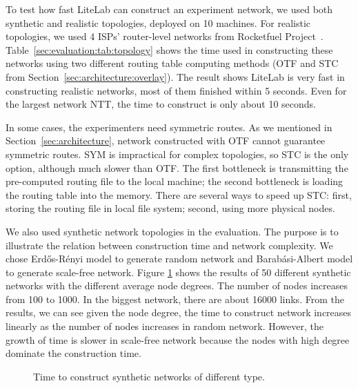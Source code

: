 \documentclass[conference]{IEEEtran}
\begin{document}
To test how fast LiteLab can construct an experiment network, we used
both synthetic and realistic topologies, deployed on 10 machines. For
realistic topologies, we used 4 ISPs' router-level networks from
Rocketfuel Project~\cite{SpringN:Rocketfuel}.
Table~\ref{sec:evaluation:tab:topology} shows the time used in
constructing these networks using two different routing table
computing methods (OTF and STC from
Section~\ref{sec:architecture:overlay}).  The result shows LiteLab is
very fast in constructing realistic networks, most of them finished
within 5 seconds. Even for the largest network NTT, the time to
construct is only about 10 seconds.

In some cases, the experimenters need symmetric routes. As we
mentioned in Section~\ref{sec:architecture}, network constructed with
OTF cannot guarantee symmetric routes. SYM is impractical for complex
topologies, so STC is the only option, although much slower than
OTF. The first bottleneck is transmitting the pre-computed routing
file to the local machine; the second bottleneck is loading the
routing table into the memory. There are several ways to speed up STC:
first, storing the routing file in local file system; second, using
more physical nodes.

We also used synthetic network topologies in the evaluation. The
purpose is to illustrate the relation between construction time and
network complexity. We chose Erd\H{o}s-R\'{e}nyi model to generate
random network and Barab\'{a}si-Albert model to generate scale-free
network.  Figure \ref{sec:evaluation:fig:topology} shows the results
of 50 different synthetic networks with the different average node
degrees. The number of nodes increases from 100 to 1000. In the
biggest network, there are about 16000 links.  From the results, we
can see given the node degree, the time to construct network increases
linearly as the number of nodes increases in random network. However,
the growth of time is slower in scale-free network because the nodes
with high degree dominate the construction time.





\begin{figure}[!tb]
  \centering {}
  \quad {}
  \caption{Time to construct synthetic networks of different type.}
  \label{sec:evaluation:fig:topology}
  \vskip -2mm
\end{figure}
\end{document}
